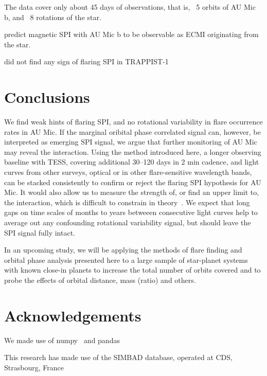 \documentclass[fleqn,usenatbib,letters]{mnras}%
\begin{document}
The data cover only about 45 days of observations, that is, ~5 orbits of AU Mic b, and ~8 rotations of the star.

\citet{kavanagh2021} predict magnetic SPI with AU Mic b to be observable as ECMI originating from the star.  

\citet{fischer2019} did not find any sign of flaring SPI in TRAPPIST-1  
\section{Conclusions}
We find weak hints of flaring SPI, and no rotational variability in flare occurrence rates in AU Mic. If the marginal oribital phase correlated signal can, however, be interpreted as emerging SPI signal, we argue that further monitoring of AU Mic may reveal the interaction. Using the method introduced here, a longer observing baseline with TESS, covering additional 30--120 days in 2 min cadence, and light curves from other surveys, optical or in other flare-sensitive wavelength bands, can be stacked consistently to confirm or reject the flaring SPI hypothesis for AU Mic. It would also allow us to measure the strength of, or find an upper limit to, the interaction, which is difficult to constrain in theory~\citep{strugarek2019}. We expect that long gaps on time scales of months to years betweeen consecutive light curves help to average out any confounding rotational variability signal, but should leave the SPI signal fully intact.

% 

In an upcoming study, we will be applying the methods of flare finding and orbital phase analysis presented here to a large sample of star-planet systems with known close-in planets to increase the total number of orbits covered and to probe the effects of orbital distance, mass (ratio) and others.
\section*{Acknowledgements}
We made use of numpy~\citep{numpy2020} and pandas~\citep{pandas2010,pandas2020software}

This research has made use of the SIMBAD database, operated at CDS, Strasbourg, France~\citep{wenger2000}

\end{document}
